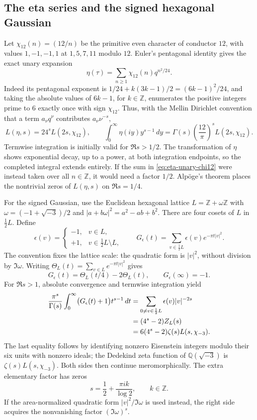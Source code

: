 \subsection{The eta series and the signed hexagonal Gaussian}
\label{sec:eta-signed-mellin}
Let $\chi_{12}(n)=(12/n)$ be the primitive even character of conductor
$12$, with values $1,-1,-1,1$ at $1,5,7,11$ modulo $12$.
Euler's pentagonal identity gives the exact unary expansion
\begin{equation}\label{eq:eta-unary-chi12}
 \eta(\tau)=\sum_{n\geq1}\chi_{12}(n)q^{n^2/24}.
\end{equation}
Indeed its pentagonal exponent is
$1/24+k(3k-1)/2=(6k-1)^2/24$, and taking the absolute values of
$6k-1$, for $k\in\mathbb Z$, enumerates the positive integers prime to
$6$ exactly once with sign $\chi_{12}$.
Thus, with the Mellin Dirichlet convention that a term $a_\nu q^\nu$
contributes $a_\nu\nu^{-s}$,
\begin{equation}\label{eq:eta-mellin-dirichlet}
 L(\eta,s)=24^sL(2s,\chi_{12}),\qquad
 \int_0^\infty\eta(iy)y^{s-1}\,dy
   =\Gamma(s)\left(\frac{12}{\pi}\right)^s L(2s,\chi_{12}).
\end{equation}
Termwise integration is initially valid for $\Re s>1/2$.
The transformation of $\eta$ shows exponential decay, up to a power,
at both integration endpoints, so the completed integral extends
entirely.  If the sum in \eqref{eq:eta-unary-chi12} were instead taken over
all $n\in\mathbb Z$, it would need a factor $1/2$.
Alp\"oge's theorem places the nontrivial zeros of $L(\eta,s)$
on $\Re s=1/4$.

For the signed Gaussian, use the Euclidean hexagonal lattice
$L=\mathbb Z+\omega\mathbb Z$ with
$\omega=(-1+\sqrt{-3})/2$ and $|a+b\omega|^2=a^2-ab+b^2$.
There are four cosets of $L$ in $\frac12L$.  Define
\[
 \epsilon(v)=\begin{cases}-1,&v\in L,\\+1,&v\in\frac12L\setminus L,
 \end{cases}
 \qquad
 G_\epsilon(t)=\sum_{v\in\frac12L}\epsilon(v)e^{-\pi t|v|^2}.
\]
The convention fixes the lattice scale: the quadratic form is $|v|^2$,
without division by $\Im\omega$.  Writing
$\Theta_L(t)=\sum_{v\in L}e^{-\pi t|v|^2}$ gives
\[
 G_\epsilon(t)=\Theta_L(t/4)-2\Theta_L(t),\qquad G_\epsilon(\infty)=-1.
\]
For $\Re s>1$, absolute convergence and termwise integration yield
\begin{align}
 \frac{\pi^s}{\Gamma(s)}
   \int_0^\infty\bigl(G_\epsilon(t)+1\bigr)t^{s-1}\,dt
 &=\sum_{0\ne v\in\frac12L}\epsilon(v)|v|^{-2s}\notag\\
 &=(4^s-2)Z_L(s)\notag\\
 &=6(4^s-2)\zeta(s)L(s,\chi_{-3}).
 \label{eq:signed-hexagonal-mellin}
\end{align}
The last equality follows by identifying nonzero Eisenstein integers
modulo their six units with nonzero ideals; the Dedekind zeta function of
$\mathbb Q(\sqrt{-3})$ is $\zeta(s)L(s,\chi_{-3})$.
Both sides then continue meromorphically.
The extra elementary factor has zeros
\[
 s=\frac12+\frac{\pi i k}{\log2},\qquad k\in\mathbb Z.
\]
If the area-normalized quadratic form $|v|^2/\Im\omega$ is used instead,
the right side acquires the nonvanishing factor $(\Im\omega)^s$.
